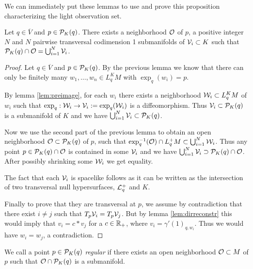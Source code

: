 We can immediately put these lemmas to use and prove this proposition characterizing the light observation set.
\begin{proposition}\label{prop:unionmanif}
Let $q\in \overline{V}$ and $p\in \mathcal{P}_K(q)$. There exists a neighborhood $\mathcal{O}$ of $p$, a positive integer $N$ and $N$ pairwise transversal codimension 1 submanifolds of $\mathcal{V}_i\subset K$ such that $\mathcal{P}_K(q) \cap \mathcal{O} = \bigcup_{i=1}^N \mathcal{V}_i$.
\end{proposition}
\begin{proof}
    Let $q\in \overline{V}$ and $p\in \mathcal{P}_K(q)$. By the previous lemma we know that there can only be finitely many $w_1,\dots,w_n\in L^K_qM$ with $\exp_q(w_i)=p$. 

    By lemma \ref{lem:preimage}, for each $w_i$ there exists a neighborhood $\mathcal{W}_i\subset L^K_qM$ of $w_i$ such that $\exp_q:\mathcal{W}_i\to \mathcal{V}_i:=\exp_q(\mathcal{W}_i)$ is a diffeomorphism. Thus $\mathcal{V}_i\subset \mathcal{P}_K(q)$ is a submanifold of $K$ and we have $\bigcup_{i=1}^N\mathcal{V}_i\subset \mathcal{P}_K(q)$. 

    Now we use the second part of the previous lemma to obtain an open neighborhood $\mathcal{O}\subset \mathcal{P}_K(q)$ of $p$, such that $\exp_q^{-1}(\mathcal{O})\cap L^+_qM\subset \bigcup_{i=1}^N \mathcal{W}_i$. Thus any point $p\in \mathcal{P}_K(q) \cap \mathcal{O}$ is contained in some $\mathcal{V}_i$ and we have $\bigcup_{i=1}^N\mathcal{V}_i \supset \mathcal{P}_K(q)\cap \mathcal{O}$. After possibly shrinking some $\mathcal{W}_i$ we get equality.

    The fact that each $\mathcal{V}_i$ is spacelike follows as it can be written as the intersection of two transversal null hypersurfaces, $\mathcal{L}^+_q$ and $K$.

    Finally to prove that they are transversal at $p$, we assume by contradiction that there exist $i\neq j$ such that $T_p\mathcal{V}_i=T_p\mathcal{V}_j$. But by lemma \ref{lem:dirreconstr} this would imply that $v_i = c*v_j$ for a $c\in \mathbb{R}_+$, where $v_i = \gamma'(1)_{q,w_i}$. Thus we would have $w_i = w_j$, a contradiction.
\end{proof}

\begin{definition}
We call a point $p\in \mathcal{P}_K(q)$ \emph{regular} if there exists an open neighborhood $\mathcal{O}\subset M$ of $p$ such that $\mathcal{O}\cap \mathcal{P}_K(q)$ is a submanifold.
\end{definition}


